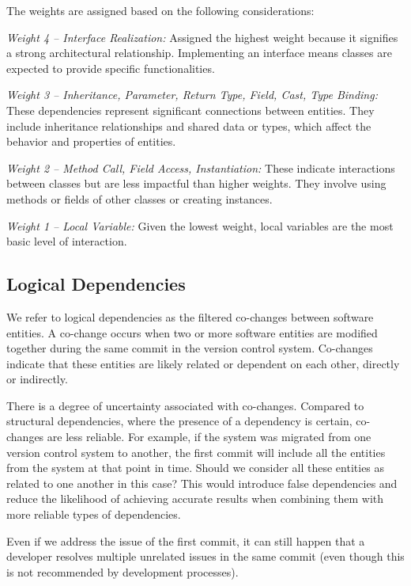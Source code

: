 \documentclass{ieeeaccess}
\begin{document}
The weights are assigned based on the following considerations:

\textit{Weight 4 – Interface Realization:} Assigned the highest weight because it signifies a strong architectural relationship. Implementing an interface means classes are expected to provide specific functionalities.

\textit{Weight 3 – Inheritance, Parameter, Return Type, Field, Cast, Type Binding:} These dependencies represent significant connections between entities. They include inheritance relationships and shared data or types, which affect the behavior and properties of entities.

\textit{Weight 2 – Method Call, Field Access, Instantiation:} These indicate interactions between classes but are less impactful than higher weights. They involve using methods or fields of other classes or creating instances.

\textit{Weight 1 – Local Variable:} Given the lowest weight, local variables are the most basic level of interaction.



\subsection{Logical Dependencies}
\label{subsec:ld}

We refer to logical dependencies as the filtered co-changes between software entities. A co-change occurs when two or more software entities are modified together during the same commit in the version control system. Co-changes indicate that these entities are likely related or dependent on each other, directly or indirectly.

There is a degree of uncertainty associated with co-changes. Compared to structural dependencies, where the presence of a dependency is certain, co-changes are less reliable. For example, if the system was migrated from one version control system to another, the first commit will include all the entities from the system at that point in time. Should we consider all these entities as related to one another in this case? This would introduce false dependencies and reduce the likelihood of achieving accurate results when combining them with more reliable types of dependencies.

Even if we address the issue of the first commit, it can still happen that a developer resolves multiple unrelated issues in the same commit (even though this is not recommended by development processes).
\end{document}
